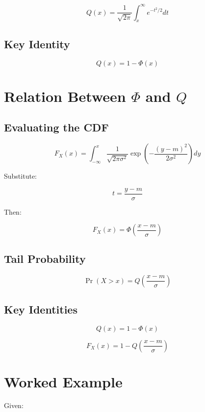 \documentclass[11pt]{article}
\begin{document}
\[
Q(x)
=
\frac{1}{\sqrt{2\pi}}
\int_x^\infty
e^{-t^2/2} dt
\]

\subsection*{Key Identity}

\[
Q(x) = 1 - \Phi(x)
\]

\newpage

\section*{Relation Between $\Phi$ and $Q$}

\subsection*{Evaluating the CDF}

\[
F_X(x)
=
\int_{-\infty}^{x}
\frac{1}{\sqrt{2\pi\sigma^2}}
\exp
\left(
-\frac{(y-m)^2}{2\sigma^2}
\right)
dy
\]

Substitute:

\[
t = \frac{y-m}{\sigma}
\]

Then:

\[
F_X(x)
=
\Phi
\left(
\frac{x-m}{\sigma}
\right)
\]

\subsection*{Tail Probability}

\[
\Pr(X > x)
=
Q
\left(
\frac{x-m}{\sigma}
\right)
\]

\subsection*{Key Identities}

\[
Q(x) = 1 - \Phi(x)
\]

\[
F_X(x)
=
1 -
Q
\left(
\frac{x-m}{\sigma}
\right)
\]

\newpage

\section*{Worked Example}

Given:
\end{document}
